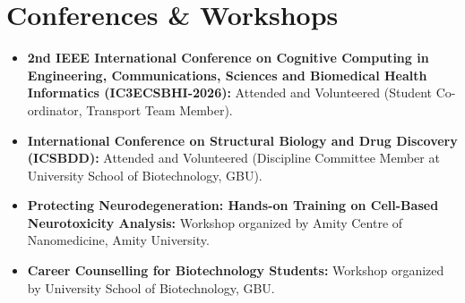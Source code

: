\documentclass[13pt,a4paper]{article}
\begin{document}
\section{Conferences \& Workshops}
\begin{itemize}[leftmargin=0.15in, label={}]
    \item \textbf{2nd IEEE International Conference on Cognitive Computing in Engineering, Communications, Sciences and Biomedical Health Informatics (IC3ECSBHI-2026):} Attended and Volunteered (Student Co-ordinator, Transport Team Member).
    \item \textbf{International Conference on Structural Biology and Drug Discovery (ICSBDD):} Attended and Volunteered (Discipline Committee Member at University School of Biotechnology, GBU).
    \item \textbf{Protecting Neurodegeneration: Hands-on Training on Cell-Based Neurotoxicity Analysis:} Workshop organized by Amity Centre of Nanomedicine, Amity University.
    \item \textbf{Career Counselling for Biotechnology Students:} Workshop organized by University School of Biotechnology, GBU.
\end{itemize}
\end{document}
